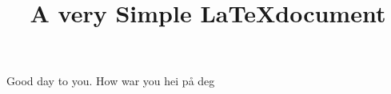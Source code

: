 \documentclass{article}
\begin{document}
\title{A very Simple \LaTeX document}
\date{}
\maketitle

Good day to you. How war you hei på deg
\end{document}

